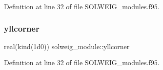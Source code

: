 Definition at line 32 of file S\+O\+L\+W\+E\+I\+G\+\_\+modules.\+f95.

\mbox{\label{namespacesolweig__module_ac214a03385acfaa638e2a31c58f182ee}} 
\subsubsection{\texorpdfstring{yllcorner}{yllcorner}}
{\footnotesize\ttfamily real(kind(1d0)) solweig\+\_\+module\+::yllcorner}



Definition at line 32 of file S\+O\+L\+W\+E\+I\+G\+\_\+modules.\+f95.

